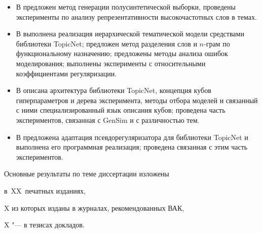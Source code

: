 \begin{itemize}

    \item В \cite{intracoh} предложен метод генерации полусинтетической выборки, проведены эксперименты по анализу репрезентативности высокочастотных слов в темах.

    \item В \cite{popov_hier} выполнена реализация иерархической тематической модели средствами библиотеки TopicNet; предложен метод разделения слов и $n$-грам по функциональному назначению; предложены методы анализа ошибок моделирования; выполнены эксперименты с относительными коэффициентами регуляризации.

    \item В \cite{bulatov2020topicnet} описана архитектура библиотеки TopicNet, концепция кубов гиперпараметров и дерева эксперимента, методы отбора моделей и связанный с ними специализированный язык описания кубов; проведена часть экспериментов, связанная с GenSim и с различностью тем.

    \item В \cite{thetaless} предложена адаптация псевдорегуляризатора для библиотеки TopicNet и выполнена его программная реализация; проведена связанная с этим часть экспериментов.

\end{itemize}




{%

    {\publications} Основные результаты по теме диссертации изложены

    в~XX~печатных изданиях,

    X из которых изданы в журналах, рекомендованных ВАК,

    X "--- в тезисах докладов.

}%


